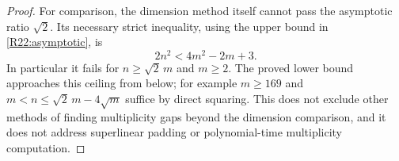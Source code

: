 \begin{proof}
For comparison, the dimension method itself cannot pass the
asymptotic ratio $\sqrt2$. Its necessary strict inequality, using
the upper bound in \eqref{R22:asymptotic}, is
\[
 2n^2<4m^2-2m+3.
\]
In particular it fails for $n\geq\sqrt2\,m$ and $m\geq2$.
The proved lower bound approaches this ceiling from below; for
example $m\geq169$ and
$m<n\leq\sqrt2\,m-4\sqrt m$ suffice by direct squaring.
This does not exclude other methods of finding multiplicity gaps
beyond the dimension comparison, and it does not address
superlinear padding or polynomial-time multiplicity computation.
\end{proof}

